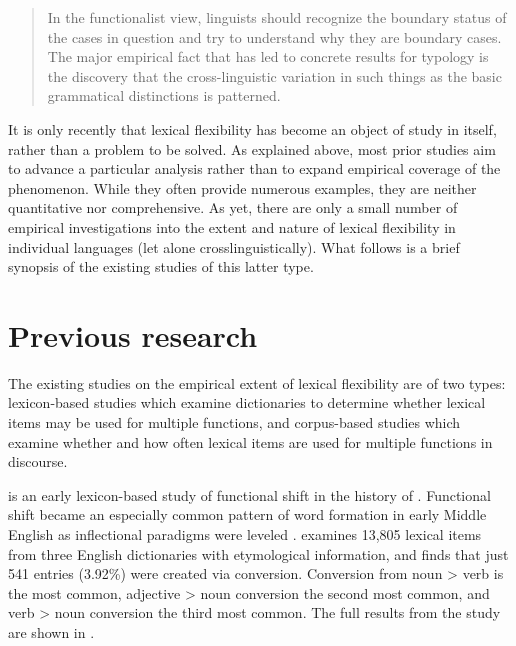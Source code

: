\blockquote[{\cite[23]{Croft1991}}]{In the functionalist view, linguists should recognize the boundary status of the cases in question and try to understand why they are boundary cases. The major empirical fact that has led to concrete results for typology is the discovery that the cross-linguistic variation in such things as the basic grammatical distinctions is patterned.}

It is only recently that lexical flexibility has become an object of study in itself, rather than a problem to be solved. As explained above, most prior studies aim to advance a particular analysis rather than to expand empirical coverage of the phenomenon. While they often provide numerous examples, they are neither quantitative nor comprehensive. As yet, there are only a small number of empirical investigations into the extent and nature of lexical flexibility in individual languages (let alone crosslinguistically). What follows is a brief synopsis of the existing studies of this latter type.

\section{Previous research}
\label{sec:1.2}

The existing studies on the empirical extent of lexical flexibility are of two types: lexicon-based studies which examine dictionaries to determine whether lexical items may be used for multiple functions, and corpus-based studies which examine whether and how often lexical items are used for multiple functions in discourse.

\textcite{Cannon1985} is an early lexicon-based study of functional shift in the history of . Functional shift became an especially common pattern of word formation in early Middle English as inflectional paradigms were leveled \parencite[414]{Cannon1985}. \citeauthor{Cannon1985} examines 13,805 lexical items from three English dictionaries with etymological information, and finds that just 541 entries (3.92\%) were created via conversion. Conversion from noun > verb is the most common, adjective > noun conversion the second most common, and verb > noun conversion the third most common. The full results from the study are shown in .

